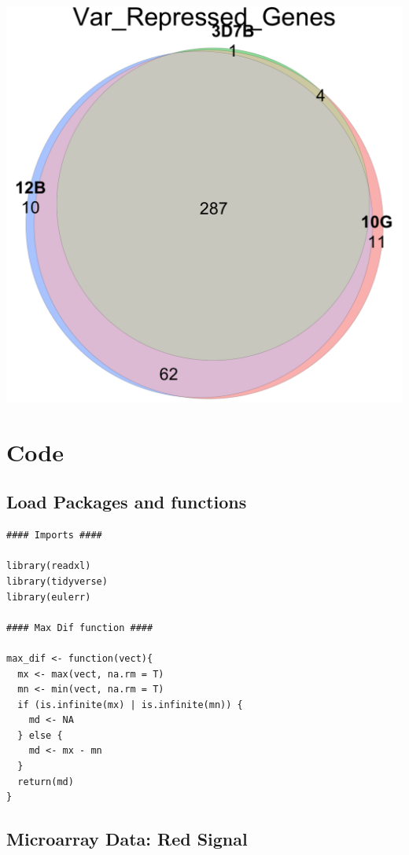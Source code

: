 \documentclass[11pt]{article}
\begin{document}
\begin{center}
\includegraphics[width=.9\linewidth]{./Plots/venn_Var_Repressed_Genes.png}
\end{center}


\section{Code}
\label{sec:org7454fac}
\subsection{Load Packages and functions}
\label{sec:orgfaa58e8}
\begin{verbatim}
#### Imports ####

library(readxl)
library(tidyverse)
library(eulerr)

#### Max Dif function ####

max_dif <- function(vect){
  mx <- max(vect, na.rm = T)
  mn <- min(vect, na.rm = T)
  if (is.infinite(mx) | is.infinite(mn)) {
    md <- NA
  } else {
    md <- mx - mn
  }
  return(md)
}
\end{verbatim}

\subsection{Microarray Data: Red Signal}
\label{sec:org569e8a9}
\end{document}
